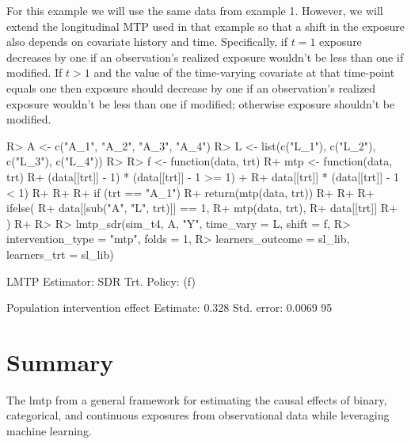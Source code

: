 \documentclass[twoside,11pt]{article}
\newenvironment{CodeChunk}{}{}
\newcommand{\pkg}[1]{{\fontseries{b}\selectfont #1}}
\begin{document}
For this example we will use the same data from example 1. However, we will extend the longitudinal MTP used in that example so that a shift in the exposure also depends on covariate history and time. Specifically, if $t = 1$ exposure decreases by one if an observation's realized exposure wouldn’t be less than one if modified. If $t > 1$ and the value of the time-varying covariate at that time-point equals one then exposure should decrease by one if an observation's realized exposure wouldn’t be less than one if modified; otherwise exposure shouldn't be modified.

\begin{CodeChunk}
\begin{CodeInput}
R> A <- c("A_1", "A_2", "A_3", "A_4")
R> L <- list(c("L_1"), c("L_2"), c("L_3"), c("L_4"))
R> 
R> f <- function(data, trt) {
R+   mtp <- function(data, trt) {
R+     (data[[trt]] - 1) * (data[[trt]] - 1 >= 1) +
R+       data[[trt]] * (data[[trt]] - 1 < 1)
R+   }
R+ 
R+   if (trt == "A_1") {
R+     return(mtp(data, trt))
R+   }
R+ 
R+   ifelse(
R+     data[[sub("A", "L", trt)]] == 1,
R+     mtp(data, trt),
R+     data[[trt]]
R+   )
R+ } 
R>
R> lmtp_sdr(sim_t4, A, "Y", time_vary = L, shift = f,
R>          intervention_type = "mtp", folds = 1,
R>          learners_outcome = sl_lib, learners_trt = sl_lib)
\end{CodeInput}

\begin{CodeOutput}
LMTP Estimator: SDR
   Trt. Policy: (f)

Population intervention effect
      Estimate: 0.328
    Std. error: 0.0069
        95%
\end{CodeOutput} 
\end{CodeChunk}

\hypertarget{summary}{\section{Summary}\label{summary}}

The \pkg{lmtp} from a general framework for estimating the causal effects of binary, categorical, and continuous exposures from observational data while leveraging machine learning. 

\newpage


\end{document}
